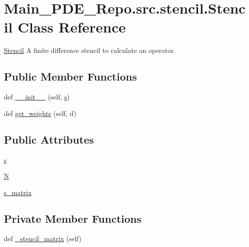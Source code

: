 \hypertarget{classMain__PDE__Repo_1_1src_1_1stencil_1_1Stencil}{}\section{Main\+\_\+\+P\+D\+E\+\_\+\+Repo.\+src.\+stencil.\+Stencil Class Reference}
\label{classMain__PDE__Repo_1_1src_1_1stencil_1_1Stencil}


\hyperlink{classMain__PDE__Repo_1_1src_1_1stencil_1_1Stencil}{Stencil} A finite difference stencil to calculate an operator.  


\subsection*{Public Member Functions}
\begin{DoxyCompactItemize}
\item 
def \hyperlink{classMain__PDE__Repo_1_1src_1_1stencil_1_1Stencil_ac28834812ca6c6afcaf499809a8f6c57}{\+\_\+\+\_\+init\+\_\+\+\_\+} (self, \hyperlink{classMain__PDE__Repo_1_1src_1_1stencil_1_1Stencil_a8522227e34c5d0d63a988ccf1d589fd9}{s})
\item 
def \hyperlink{classMain__PDE__Repo_1_1src_1_1stencil_1_1Stencil_a929a771df412bf27d03c2aae1a4ee7a0}{get\+\_\+weights} (self, d)
\end{DoxyCompactItemize}
\subsection*{Public Attributes}
\begin{DoxyCompactItemize}
\item 
\hyperlink{classMain__PDE__Repo_1_1src_1_1stencil_1_1Stencil_a8522227e34c5d0d63a988ccf1d589fd9}{s}
\item 
\hyperlink{classMain__PDE__Repo_1_1src_1_1stencil_1_1Stencil_a23797c4ec3adad5ab929cc221de8d7f7}{N}
\item 
\hyperlink{classMain__PDE__Repo_1_1src_1_1stencil_1_1Stencil_a008c7722934b3af3a21d8d945f12b597}{s\+\_\+matrix}
\end{DoxyCompactItemize}
\subsection*{Private Member Functions}
\begin{DoxyCompactItemize}
\item 
def \hyperlink{classMain__PDE__Repo_1_1src_1_1stencil_1_1Stencil_a785c9ea7126ed706d574907d114ccf57}{\+\_\+stencil\+\_\+matrix} (self)
\end{DoxyCompactItemize}



